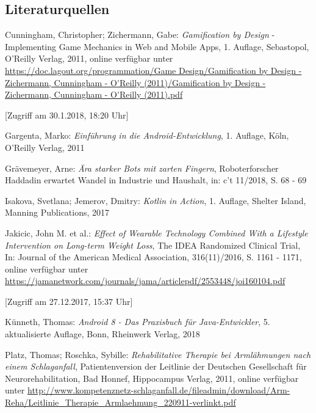 \renewcommand{\refname}{Literatur- und Quellenverzeichnis}

\begin{thebibliography}{xxxxxx}

\subsection*{Literaturquellen}

 Cunningham, Christopher; Zichermann, Gabe: \textit{Gamification by Design} - Implementing Game Mechanics in Web and Mobile Apps, 1. Auflage, Sebastopol, O'Reilly Verlag, 2011, online verfügbar unter \url{https://doc.lagout.org/programmation/Game Design/Gamification by Design - Zichermann, Cunningham - O'Reilly (2011)/Gamification by Design - Zichermann, Cunningham - O'Reilly (2011).pdf}

[Zugriff am 30.1.2018, 18:20 Uhr]

 Gargenta, Marko: \textit{Einführung in die Android-Entwicklung}, 1. Auflage, Köln, O'Reilly Verlag, 2011

 Grävemeyer, Arne: \textit{Ära starker Bots mit zarten Fingern}, Roboterforscher Haddadin erwartet Wandel in Industrie und Haushalt, in: c't 11/2018, S. 68 - 69

 Isakova, Svetlana; Jemerov, Dmitry: \textit{Kotlin in Action}, 1. Auflage, Shelter Island, Manning Publications, 2017

 Jakicic, John M. et al.: \textit{Effect of Wearable Technology Combined With a Lifestyle Intervention on Long-term Weight Loss}, The IDEA Randomized Clinical Trial, In: Journal of the American Medical Association, 316(11)/2016, S. 1161 - 1171, online verfügbar unter \url{https://jamanetwork.com/journals/jama/articlepdf/2553448/joi160104.pdf}

[Zugriff am 27.12.2017, 15:37 Uhr]

 Künneth, Thomas: \textit{Android 8 - Das Praxisbuch für Java-Entwickler}, 5. aktualisierte Auflage, Bonn, Rheinwerk Verlag, 2018

 Platz, Thomas; Roschka, Sybille: \textit{Rehabilitative Therapie bei Armlähmungen nach einem Schlaganfall}, Patientenversion der Leitlinie der Deutschen Gesellschaft für Neurorehabilitation, Bad Honnef, Hippocampus Verlag, 2011, 
online verfügbar unter \url{http://www.kompetenznetz-schlaganfall.de/fileadmin/download/Arm-Reha/Leitlinie_Therapie_Armlaehmung_220911-verlinkt.pdf} 


\end{thebibliography}
